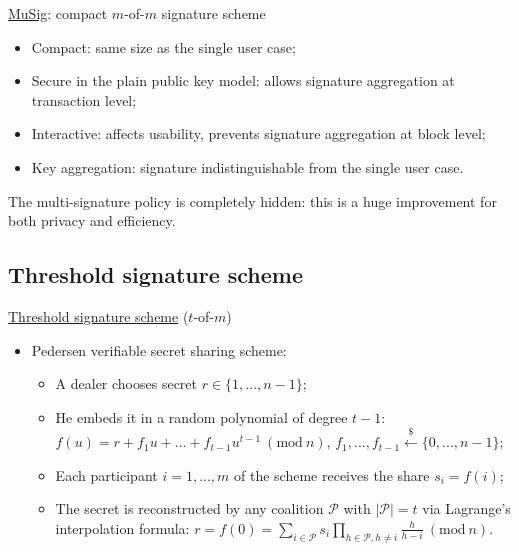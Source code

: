\documentclass[slidescentered]{beamer}
\begin{document}
	\begin{frame}{\hyperlink{musig}{MuSig}: compact $m$-of-$m$ signature scheme}
		\begin{itemize}
			\item Compact: same size as the single user case;
			\item Secure in the plain public key model: allows signature aggregation at transaction level;
			\item Interactive: affects usability, prevents signature aggregation at block level;
			\item Key aggregation: signature indistinguishable from the single user case.
		\end{itemize}
		The multi-signature policy is completely hidden: this is a huge improvement for both privacy and efficiency.
	\end{frame}
	

	\subsection{Threshold signature scheme}
	\begin{frame}{\hyperlink{threshold}{Threshold signature scheme} ($t$-of-$m$)}
		\begin{itemize}
			\item Pedersen verifiable secret sharing scheme:
			\begin{itemize}
				\item A dealer chooses secret $r \in \{1, ..., n - 1\}$;
				\item He embeds it in a random polynomial of degree $t - 1$:
				$f(u) = r + f_1u + ... + f_{t - 1}u^{t - 1} \ (\text{mod} \ n)$, $f_1, ..., f_{t - 1}\xleftarrow{\text{\$}} \{0, ..., n - 1\}$;
				\item Each participant $i = 1, ..., m$ of the scheme receives the share $s_i = f(i)$;
				\item The secret is reconstructed by any coalition $\mathcal{P}$ with $|\mathcal{P}| = t$ via Lagrange's interpolation formula: $r = f(0) = \sum_{i \in \mathcal{P}}s_i\prod_{h \in \mathcal{P}, h \neq i}\frac{h}{h - i} \ (\text{mod} \ n)$.
			\end{itemize}
		\end{itemize}
	\end{frame}
\end{document}
